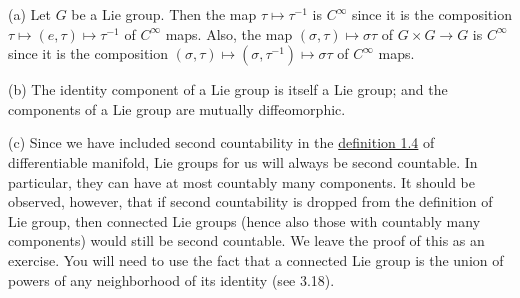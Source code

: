 \begin{remarks}\label{thm:3.2}
(a) Let $G$ be a Lie group. Then the map $\tau \mapsto \tau^{-1}$ is $C^\infty$ since it is the composition $\tau \mapsto (e, \tau) \mapsto \tau^{-1}$ of $C^\infty$ maps. Also, the map $(\sigma, \tau) \mapsto \sigma\tau$ of $G \times G \to G$ is $C^\infty$ since it is the composition $(\sigma, \tau) \mapsto (\sigma, \tau^{-1}) \mapsto \sigma\tau$ of $C^\infty$ maps.

(b) The identity component of a Lie group is itself a Lie group; and the components of a Lie group are mutually diffeomorphic.

(c) Since we have included second countability in the \hyperref[thm:1.4]{definition 1.4} of differentiable manifold, Lie groups for us will always be second countable. In particular, they can have at most countably many components. It should be observed, however, that if second countability is dropped from the definition of Lie group, then connected Lie groups (hence also those with countably many components) would still be second countable. We leave the proof of this as an exercise. You will need to use the fact that a connected Lie group is the union of powers of any neighborhood of its identity (see 3.18).

\end{remarks}

